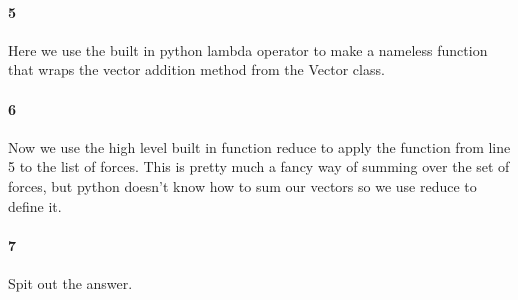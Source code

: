 \documentclass[15pt]{report}
\begin{document}
\paragraph{5} Here we use the built in python lambda operator to make a nameless function that wraps the vector addition method from the Vector class.
\paragraph{6} Now we use the high level built in function reduce to apply the function from line 5 to the list of forces. This is pretty much a fancy way of summing over the set of forces, but python doesn't know how to sum our vectors so we use reduce to define it.
\paragraph{7} Spit out the answer.
\printbibliography
\end{document}
